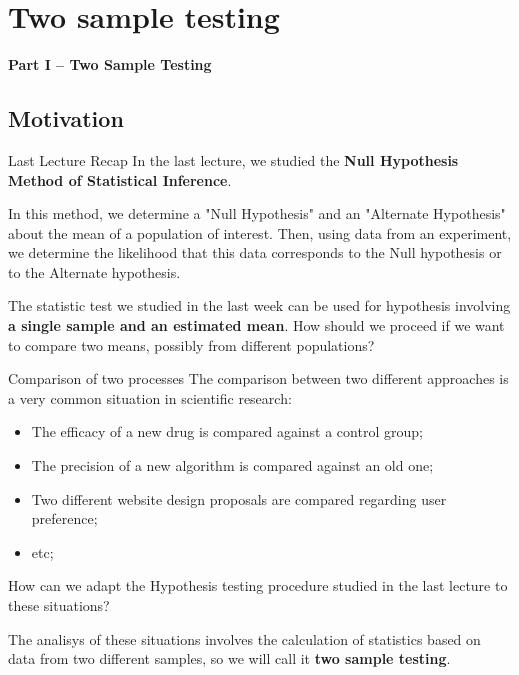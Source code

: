 \section{Two sample testing}

\begin{frame}
  \begin{center}
    {\bf Part I -- Two Sample Testing}
  \end{center}
\end{frame}

\subsection{Motivation}

\begin{frame}{Last Lecture Recap}
  In the last lecture, we studied the {\bf Null Hypothesis Method of
  Statistical Inference}. \bigskip

  In this method, we determine a "Null Hypothesis" and an "Alternate Hypothesis"
  about the mean of a population of interest. Then, using data from an experiment,
  we determine the likelihood that this data corresponds to the Null hypothesis or to the Alternate hypothesis.\bigskip

  The statistic test we studied in the last week can be used for hypothesis
  involving {\bf a single sample and an estimated mean}. How should we proceed
  if we want to compare two means, possibly from different populations?
\end{frame}


\begin{frame}{Comparison of two processes}
  The comparison between two different approaches is a very common situation in scientific research:\bigskip

  \begin{itemize}
    \item The efficacy of a new drug is compared against a control group;

    \item The precision of a new algorithm is compared against an old one;

    \item Two different website design proposals are compared regarding user preference;

    \item etc;
  \end{itemize}
  \bigskip

  How can we adapt the Hypothesis testing procedure studied in the last lecture to these situations?\bigskip

  The analisys of these situations involves the calculation of statistics based on data from two different samples, so we will call it {\bf two sample testing}.
\end{frame}



